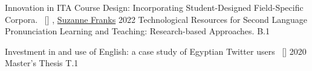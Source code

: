 
\begin{publications}
\publication
	{Innovation in ITA Course Design: Incorporating Student-Designed Field-Specific Corpora.}{~ [\href{https://www.barnesandnoble.com/w/technological-resources-for-second-language-pronunciation-learning-and-teaching-shannon-mccrocklin/1142099262}{\small{\linkSymbol}}]}
	{\underline{}, \href{https://linguistics.illinois.edu/directory/profile/scfranks} {Suzanne Franks}}
	{2022} {Technological Resources for Second Language Pronunciation Learning and Teaching: Research-based Approaches.}  {B.1}


\publication
	{Investment in and use of English: a case study of Egyptian Twitter users}{~ [\href{https://www.ideals.illinois.edu/items/116173}{\small{\linkSymbol}}]}
	{\underline{}}
	{2020} {Master's Thesis} {T.1}
	
\end{publications}

\vspace{-3mm}